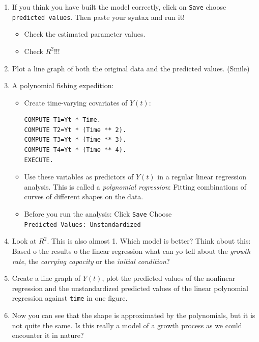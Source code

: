 \documentclass[]{book}
\providecommand{\tightlist}{%
  \setlength{\itemsep}{0pt}\setlength{\parskip}{0pt}}
\begin{document}
\begin{enumerate}
\def\labelenumi{\arabic{enumi}.}
\setcounter{enumi}{4}
\item
  If you think you have built the model correctly, click on
  \texttt{Save} choose \texttt{predicted\ values}. Then paste your
  syntax and run it!

  \begin{itemize}
  \tightlist
  \item
    Check the estimated parameter values.
  \item
    Check \(R^2\)!!!
  \end{itemize}
\item
  Plot a line graph of both the original data and the predicted values.
  (Smile)
\item
  A polynomial fishing expedition:

  \begin{itemize}
  \item
    Create time-varying covariates of \(Y(t)\):

\begin{verbatim}
COMPUTE T1=Yt * Time.
COMPUTE T2=Yt * (Time ** 2). 
COMPUTE T3=Yt * (Time ** 3). 
COMPUTE T4=Yt * (Time ** 4). 
EXECUTE.
\end{verbatim}
  \item
    Use these variables as predictors of \(Y(t)\) in a regular linear
    regression analysis. This is called a \emph{polynomial regression}:
    Fitting combinations of curves of different shapes on the data.
  \item
    Before you run the analysis: Click \texttt{Save} Choose
    \texttt{Predicted\ Values:\ Unstandardized}
  \end{itemize}
\item
  Look at \(R^2\). This is also almost 1. Which model is better? Think
  about this: Based o the results o the linear regression what can yo
  tell about the \emph{growth rate}, the \emph{carrying capacity} or the
  \emph{initial condition}?
\item
  Create a line graph of \(Y(t)\), plot the predicted values of the
  nonlinear regression and the unstandardized predicted values of the
  linear polynomial regression against \texttt{time} in one figure.
\item
  Now you can see that the shape is approximated by the polynomials, but
  it is not quite the same. Is this really a model of a growth process
  as we could encounter it in nature?
\end{enumerate}
\end{document}
